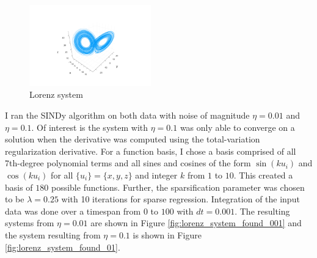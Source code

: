 \documentclass[10pt]{paper}
\begin{document}
\begin{figure}[h]
	\caption{Lorenz system}
	\label{fig:lorenz_system_actual}

	\centering
	\includegraphics[width = 0.47\textwidth, trim={4.3cm, 1.9cm, 4.3cm, 3.5cm}, clip]{lorenz_actual_graph.png}
\end{figure}

I ran the SINDy algorithm on both data with noise of magnitude $\eta = 0.01$ and $\eta = 0.1$. Of interest is the system with $\eta = 0.1$ was only able to converge on a solution when the derivative was computed using the total-variation regularization derivative. 
For a function basis, I chose a basis comprised of all 7th-degree polynomial terms and all sines and cosines of the form $\sin{(ku_i)}$ and $\cos{(ku_i)}$ for all $\{u_i\} = \{x,y,z\}$ and integer $k$ from $1$ to $10$. This created a basis of $180$ possible functions. 
Further, the sparsification parameter was chosen to be $\lambda = 0.25$ with 10 iterations for sparse regression.
Integration of the input data was done over a timespan from $0$ to $100$ with $dt = 0.001$. 
The resulting systems from $\eta = 0.01$ are shown in Figure \ref{fig:lorenz_system_found_001} and the system resulting from $\eta = 0.1$ is shown in Figure \ref{fig:lorenz_system_found_01}. 
\end{document}
